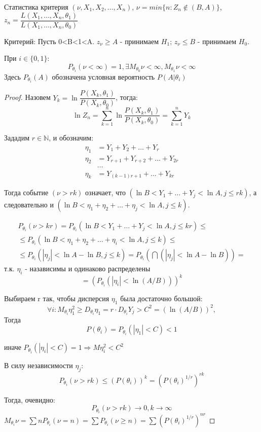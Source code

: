 Статистика критерия $(\nu, X_1, X_2, \dots, X_n)$,
$\nu = min \{ n : Z_n \notin (B, A) \}$,
$z_n = \dfrac{L(X_1, \dots, X_n, \theta_1)}{L(X_1, \dots, X_n, \theta_0)}$

Критерий: Пусть 0<B<1<A.
$z_\nu \geqslant A$ - принимаем $H_1$; $z_\nu \leqslant B$ - принимаем $H_0$.

\begin{theorem}
  При $i \in \{ 0, 1 \}$:
  \[
    P_{\theta_i}(\nu < \infty) = 1, \exists M_{\theta_0} \nu < \infty, M_{\theta_1} \nu < \infty
  \]
  Здесь $P_{\theta_i} (A)$ обозначена условная вероятность $P(A | \theta_i)$
\end{theorem}

\begin{proof}
  Назовем $Y_k = \ln \dfrac{P(X_k, \theta_1)}{P(X_k, \theta_0)}$, тогда:
  \[
    \ln Z_n = \sum_{k=1}^n \ln \dfrac{P(X_k, \theta_1)}{P(X_k, \theta_0)} = \sum_{k=1}^n Y_k
  \]

  Зададим $r \in \mathbb{N}$, и обозначим:
  \begin{align*}
    \eta_1 &= Y_1 + Y_2 + \dots + Y_r \\
    \eta_2 &= Y_{r+1} + Y_{r+2} + \dots + Y_{2r} \\
           &\dots \\
    \eta_k &= Y_{(k-1) r + 1} + \dots + Y_{kr}
  \end{align*}

  Тогда событие $(\nu > rk)$ означает, что $(\ln B < Y_1 + \dots + Y_j < \ln A, j \leqslant rk)$, а следовательно и $(\ln B < \eta_1 + \eta_2 + \dots + \eta_j < \ln A, j \leqslant k)$.

  \begin{multline*}
    P_{\theta_i} (\nu > kr)
    = P_{\theta_i} (\ln B < Y_1 + \dots + Y_j < \ln A, j \leqslant kr) \leqslant \\
    \leqslant P_{\theta_i} (\ln B < \eta_1 + \eta_2 + \dots + \eta_i < \ln A, j \leqslant k) \leqslant \\
    \leqslant P_{\theta_i} (|\eta_j| < \ln A - \ln B, j \leqslant k)
    = P_{\theta_i} \left(\bigcap (|\eta_j| < \ln A - \ln B)\right) =
  \end{multline*}
  т.к. $\eta_i$ - назависимы и одинаково распределены \\
  \[
    = (P_{\theta_i} (|\eta_i| < \ln (A/B)))^k
  \]

  Выбираем r так, чтобы дисперсия $\eta_1$ была достаточно большой:
  \[
    \forall i : M_{\theta_i} \eta_1^2 \geqslant D_{\theta_i} \eta_1
    = r \cdot D_{\theta_i} Y_j > C^2 = (\ln (A/B))^2,
  \]
  Тогда
  \[
    P(\theta_i) = P_{\theta_i} (|\eta_1| < C) < 1
  \]

  иначе $P_{\theta_i} (|\eta_i| < C) = 1 \Rightarrow M \eta_i^2 < C^2$

  В силу независимости $\eta_j$:
  \[
    P_{\theta_i} (\nu > rk) \leqslant (P(\theta_i))^k = (P(\theta_i)^{1/r})^{rk}
  \]

  Тогда, очевидно:
  \[
    P_{\theta_i} (\nu > rk) \to 0, k \to \infty
  \]
  $M_{\theta_i} \nu = \sum n P_{\theta_i} (\nu  = n) = \sum P_{\theta_i} (\nu \geqslant n) = \sum ( P(\theta_i)^{1/r} )^{nr}$
\end{proof}

